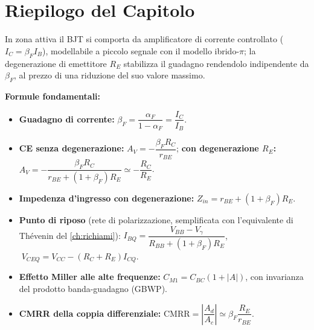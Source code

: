 \section*{Riepilogo del Capitolo}

\begin{important}
In zona attiva il BJT si comporta da amplificatore di corrente controllato ($I_C = \beta_F I_B$), modellabile a piccolo segnale con il modello ibrido-$\pi$; la degenerazione di emettitore $R_E$ stabilizza il guadagno rendendolo indipendente da $\beta_F$, al prezzo di una riduzione del suo valore massimo.
\end{important}

\begin{note}
\textbf{Formule fondamentali:}
\begin{itemize}
    \item \textbf{Guadagno di corrente:} $\beta_F = \dfrac{\alpha_F}{1-\alpha_F} = \dfrac{I_C}{I_B}$.
    \item \textbf{CE senza degenerazione:} $A_V = -\dfrac{\beta_F R_C}{r_{BE}}$; \textbf{con degenerazione $R_E$:} $A_V = -\dfrac{\beta_F R_C}{r_{BE}+(1+\beta_F)R_E} \simeq -\dfrac{R_C}{R_E}$.
    \item \textbf{Impedenza d'ingresso con degenerazione:} $Z_{in} = r_{BE} + (1+\beta_F)R_E$.
    \item \textbf{Punto di riposo} (rete di polarizzazione, semplificata con l'equivalente di Thévenin del \cref{ch:richiami}): $I_{BQ} = \dfrac{V_{BB}-V_\gamma}{R_{BB}+(1+\beta_F)R_E}$, $\; V_{CEQ} = V_{CC}-(R_C+R_E)I_{CQ}$.
    \item \textbf{Effetto Miller alle alte frequenze:} $C_{M1} = C_{BC}(1+|A|)$, con invarianza del prodotto banda-guadagno (GBWP).
    \item \textbf{CMRR della coppia differenziale:} $\text{CMRR} = \left|\dfrac{A_d}{A_c}\right| \simeq \beta_F \dfrac{R_E}{r_{BE}}$.
\end{itemize}
\end{note}

